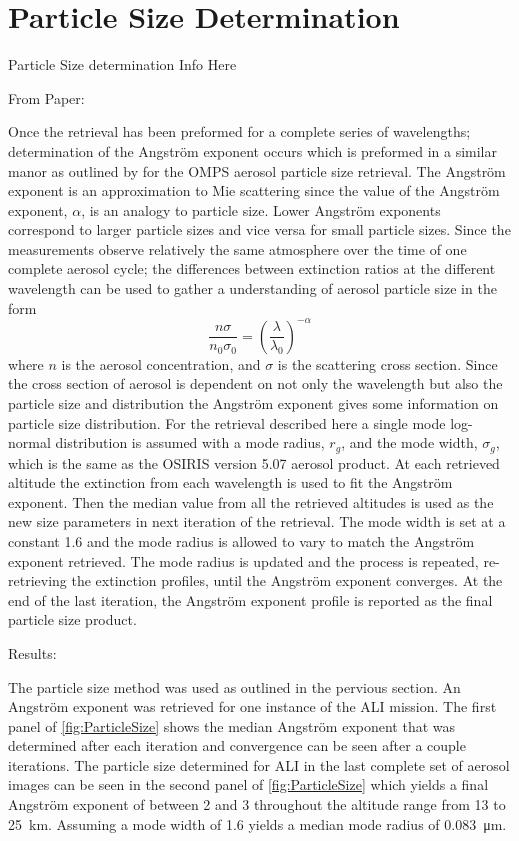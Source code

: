 \section{Particle Size Determination}

Particle Size determination Info Here

From Paper:

Once the retrieval has been preformed for a complete series of wavelengths; determination of the Angstr\"{o}m exponent occurs which is preformed in a similar manor as outlined by \cite{Rault2013} for the OMPS aerosol particle size retrieval. The Angstr\"{o}m exponent is an approximation to Mie scattering since the value of the Angstr\"{o}m exponent, $\alpha$, is an analogy to particle size. Lower Angstr\"{o}m exponents correspond to larger particle sizes and vice versa for small particle sizes. Since the measurements observe relatively the same atmosphere over the time of one complete aerosol cycle; the differences between extinction ratios at the different wavelength can be used to gather a understanding of aerosol particle size in the form
\begin{equation}
    \frac{n\sigma}{n_{0}\sigma_{0}} = \left(\frac{\lambda}{\lambda_{0}}\right)^{-\alpha}
    \label{eqn:agstromCoefficient}
\end{equation}
where $n$ is the aerosol concentration, and $\sigma$ is the scattering cross section. Since the cross section of aerosol is dependent on not only the wavelength but also the particle size and distribution the Angstr\"{o}m exponent gives some information on particle size distribution. For the retrieval described here a single mode log-normal distribution is assumed with a mode radius, $r_{g}$, and the mode width, $\sigma_{g}$, which is the same as the OSIRIS version 5.07 aerosol product. At each retrieved altitude the extinction from each wavelength is used to fit the Angstr\"{o}m exponent. Then the median value from all the retrieved altitudes is used as the new size parameters in next iteration of the retrieval. The mode width is set at a constant 1.6 and the mode radius is allowed to vary to match the Angstr\"{o}m exponent retrieved. The mode radius is updated and the process is repeated, re-retrieving the extinction profiles, until the Angstr\"{o}m exponent converges. At the end of the last iteration, the Angstr\"{o}m exponent profile is reported as the final particle size product.

Results:

The particle size method was used as outlined in the pervious section. An Angstr\"{o}m exponent was retrieved for one instance of the ALI mission. The first panel of \autoref{fig:ParticleSize} shows the median Angstr\"{o}m exponent that was determined after each iteration and convergence can be seen after a couple iterations. The particle size determined for ALI in the last complete set of aerosol images can be seen in the second panel of \autoref{fig:ParticleSize} which yields a final Angstr\"{o}m exponent of between 2 and 3 throughout the altitude range from 13 to 25~km. Assuming a mode width of 1.6 yields a median mode radius of 0.083~\si{\micro\metre}.

